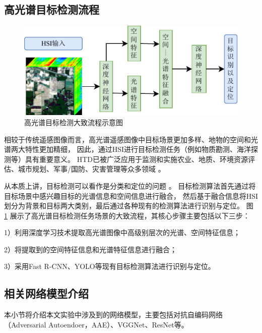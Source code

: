 \documentclass{xdupgthesis}
\begin{document}
\subsection{高光谱目标检测流程}
\begin{figure}[ht]
    \centering
    \includegraphics[width=0.74\linewidth]{高光谱目标检测流程.pdf}
    \caption{高光谱目标检测大致流程示意图}
    \label{fig_HTD}
\end{figure}
相较于传统遥感图像而言，高光谱遥感图像中目标场景更加多样、地物的空间和光谱两大特性更加精细，
因此，通过HSI进行目标检测任务（例如物质勘测、海洋探测等）具有重要意义。
HTD已被广泛应用于监测和实施农业、地质、环境资源评估、城市规划、军事/国防、灾害管理等众多领域 \cite{goetz1985imaging} \cite{teke2013short} \cite{plaza2011parallel}。

从本质上讲，目标检测可以看作是分类和定位的问题 \cite{nasrabadi2013hyperspectral} \cite{zhu2019binary}。
目标检测算法首先通过将目标场景中感兴趣目标的光谱信息和空间信息进行融合，
然后基于融合信息将HSI划分为背景和目标两大类别，最后通过各种现有的检测算法进行识别与定位。
图 \ref{fig_HTD} 展示了高光谱目标检测任务场景的大致流程，其核心步骤主要包括以下三步：

1）利用深度学习技术提取高光谱图像中高级别层次的光谱、空间特征信息；

2）将提取到的空间特征信息和光谱特征信息进行融合；

3）采用Fast R-CNN、YOLO等现有目标检测算法进行识别与定位。


\subsection{相关网络模型介绍}
本小节将介绍本文实验中涉及到的网络模型，主要包括对抗自编码网络（Adversarial Autoendoer，AAE）、VGGNet、ResNet等。
\end{document}
